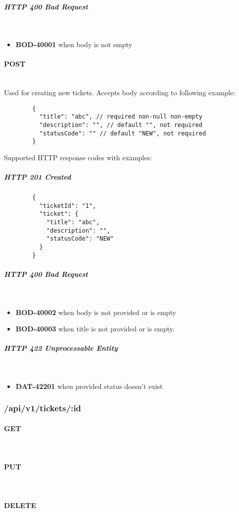 \documentclass[a4paper]{article}
\newcommand{\newLineParagraph}[1]{\paragraph{#1}\mbox{}\\}
\newcommand{\newLineSubParagraph}[1]{\subparagraph{#1}\mbox{}\\}
\begin{document}
    \newLineSubParagraph{HTTP 400 Bad Request}
    \begin{itemize}
        \item \textbf{BOD-40001} when body is not empty
    \end{itemize}

    \newLineParagraph{POST}
    Used for creating new tickets. Accepts body according to following example:
    \begin{verbatim}
        {
          "title": "abc", // required non-null non-empty
          "description": "", // default "", not required
          "statusCode": "" // default "NEW", not required
        }
    \end{verbatim}
    Supported HTTP response codes with examples:
    \subparagraph{HTTP 201 Created}
    \begin{verbatim}
        {
          "ticketId": "1",
          "ticket": {
            "title": "abc",
            "description": "",
            "statusCode": "NEW"
          }
        }
    \end{verbatim}

    \newLineSubParagraph{HTTP 400 Bad Request}
    \begin{itemize}
        \item \textbf{BOD-40002} when body is not provided or is empty
        \item \textbf{BOD-40003} when title is not provided or is empty.
    \end{itemize}

    \newLineSubParagraph{HTTP 422 Unprocessable Entity}
    \begin{itemize}
        \item \textbf{DAT-42201} when provided status doesn't exist
    \end{itemize}

    \subsubsection{/api/v1/tickets/:id}
    \newLineParagraph{GET}
    \newLineParagraph{PUT}
    \newLineParagraph{DELETE}
\end{document}

